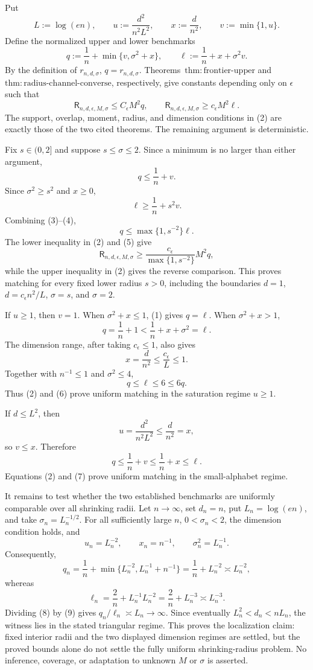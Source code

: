 Put
\[
 L:=\log(en),\qquad
 u:=\frac{d^2}{n^2L^2},\qquad
 x:=\frac d{n^2},\qquad
 v:=\min\{1,u\}.
\]
Define the normalized upper and lower benchmarks
\[
 q:=\frac1n+\min\{v,\sigma^2+x\},
 \qquad
 \ell:=\frac1n+x+\sigma^2v.
\tag{1}
\]
By the definition of \(r_{n,d,\sigma}\), \(q=r_{n,d,\sigma}\).  Theorems~\(\mathrm{thm:frontier\text{-}upper}\) and \(\mathrm{thm:radius\text{-}channel\text{-}converse}\), respectively, give constants depending only on \(\epsilon\) such that
\[
 \mathsf R_{n,d,\epsilon,M,\sigma}\le C_{\epsilon}M^2q,
 \qquad
 \mathsf R_{n,d,\epsilon,M,\sigma}\ge c_{\epsilon}M^2\ell.
\tag{2}
\]
The support, overlap, moment, radius, and dimension conditions in (2) are exactly those of the two cited theorems.  The remaining argument is deterministic.

Fix \(s\in(0,2]\) and suppose \(s\le\sigma\le2\).  Since a minimum is no larger than either argument,
\[
 q\le\frac1n+v.
\tag{3}
\]
Since \(\sigma^2\ge s^2\) and \(x\ge0\),
\[
 \ell\ge\frac1n+s^2v.
\tag{4}
\]
Combining (3)--(4),
\[
 q\le\max\{1,s^{-2}\}\ell.
\tag{5}
\]
The lower inequality in (2) and (5) give
\[
 \mathsf R_{n,d,\epsilon,M,\sigma}
 \ge \frac{c_{\epsilon}}{\max\{1,s^{-2}\}}M^2q,
\]
while the upper inequality in (2) gives the reverse comparison.  This proves matching for every fixed lower radius \(s>0\), including the boundaries \(d=1\), \(d=c_{\epsilon}n^2/L\), \(\sigma=s\), and \(\sigma=2\).

If \(u\ge1\), then \(v=1\).  When \(\sigma^2+x\le1\), (1) gives \(q=\ell\).  When \(\sigma^2+x>1\),
\[
 q=\frac1n+1<\frac1n+x+\sigma^2=\ell.
\]
The dimension range, after taking \(c_{\epsilon}\le1\), also gives
\[
 x=\frac d{n^2}\le\frac{c_{\epsilon}}L\le1.
\]
Together with \(n^{-1}\le1\) and \(\sigma^2\le4\),
\[
 q\le\ell\le6\le6q.
\tag{6}
\]
Thus (2) and (6) prove uniform matching in the saturation regime \(u\ge1\).

If \(d\le L^2\), then
\[
 u=\frac{d^2}{n^2L^2}\le\frac d{n^2}=x,
\]
so \(v\le x\).  Therefore
\[
 q\le\frac1n+v\le\frac1n+x\le\ell.
\tag{7}
\]
Equations (2) and (7) prove uniform matching in the small-alphabet regime.

It remains to test whether the two established benchmarks are uniformly comparable over all shrinking radii.  Let \(n\to\infty\), set \(d_n=n\), put \(L_n=\log(en)\), and take \(\sigma_n=L_n^{-1/2}\).  For all sufficiently large \(n\), \(0<\sigma_n<2\), the dimension condition holds, and
\[
 u_n=L_n^{-2},\qquad x_n=n^{-1},\qquad \sigma_n^2=L_n^{-1}.
\]
Consequently,
\[
 q_n=\frac1n+\min\{L_n^{-2},L_n^{-1}+n^{-1}\}
 =\frac1n+L_n^{-2}\asymp L_n^{-2},
\tag{8}
\]
whereas
\[
 \ell_n=\frac2n+L_n^{-1}L_n^{-2}
 =\frac2n+L_n^{-3}\asymp L_n^{-3}.
\tag{9}
\]
Dividing (8) by (9) gives \(q_n/\ell_n\asymp L_n\to\infty\).  Since eventually \(L_n^2<d_n<nL_n\), the witness lies in the stated triangular regime.  This proves the localization claim: fixed interior radii and the two displayed dimension regimes are settled, but the proved bounds alone do not settle the fully uniform shrinking-radius problem.  No inference, coverage, or adaptation to unknown \(M\) or \(\sigma\) is asserted.
